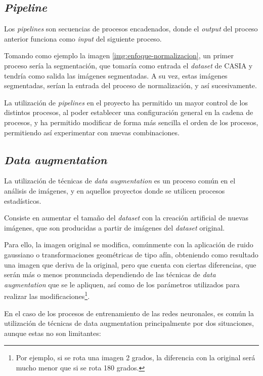 \subsection{\textit{Pipeline}}

Los \textit{pipelines} son secuencias de procesos encadenados, donde el \textit{output} del proceso anterior funciona como \textit{input} del siguiente proceso.

Tomando como ejemplo la imagen \ref{img:enfoque-normalizacion}, un primer proceso sería la segmentación, que tomaría como entrada el \textit{dataset} de CASIA y tendría como salida 
las imágenes segmentadas. A su vez, estas imágenes segmentadas, serían la entrada del proceso de normalización, y así sucesivamente.

La utilización de \textit{pipelines} en el proyecto ha permitido un mayor control de los distintos procesos, al poder establecer una configuración general en la cadena de procesos, y ha permitido modificar de forma más sencilla el orden de los procesos, permitiendo así experimentar con nuevas combinaciones.

\subsection{\textit{Data augmentation}}\label{dataaugmentation}

La utilización de técnicas de \textit{data augmentation} es un proceso común en el análisis de imágenes, y en aquellos proyectos donde se utilicen procesos estadísticos. 

Consiste en aumentar el tamaño del \textit{dataset} con la creación artificial de nuevas imágenes, que son producidas a partir de imágenes del \textit{dataset} original.

Para ello, la imagen original se modifica, comúnmente con la aplicación de ruido gaussiano o transformaciones geométricas de tipo afín, obteniendo como resultado una imagen que deriva de la original, pero que cuenta con ciertas diferencias, que serán más o menos pronunciada dependiendo de las técnicas 
de \textit{data augmentation} que se le apliquen, así como de los parámetros utilizados para realizar las modificaciones\footnote{Por ejemplo, si se rota una imagen 2 grados, la diferencia con la original será mucho menor que si se rota 180 grados.}.	

En el caso de los procesos de entrenamiento de las redes neuronales, es común la utilización de técnicas de data augmentation principalmente por dos situaciones, aunque estas no son limitantes:

